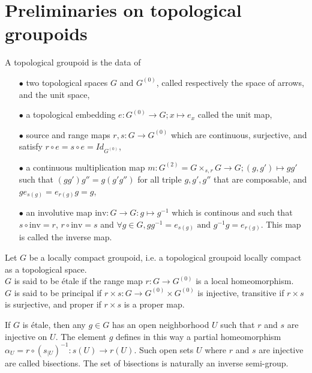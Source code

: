 \section{Preliminaries on topological groupoids}

\begin{definition}
A topological groupoid is the data of 
\begin{itemize}
\item[$\bullet$] two topological spaces $G$ and $G^{(0)}$, called respectively the space of arrows, and the unit space,
\item[$\bullet$] a topological embedding $e: G^{(0)}\rightarrow G; x\mapsto e_x$ called the unit map,
\item[$\bullet$] source and range maps $r,s : G\rightarrow G^{(0)}$ which are continuous, surjective, and satisfy $r\circ e = s\circ e = Id_{G^{(0)}}$,
\item[$\bullet$] a continuous multiplication map $m : G^{(2)}=G\times_{s,r}G\rightarrow G; (g,g')\mapsto gg'$ such that $(gg')g''=g(g'g'')$ for all triple $g,g',g''$ that are composable, and $g e_{s(g)} = e_{r(g)} g =g$,
\item[$\bullet$] an involutive map $\text{inv} : G\rightarrow G: g\mapsto g^{-1}$ which is continous and such that $s\circ \text{inv} = r$, $r\circ \text{inv} = s$ and $\forall g\in G, gg^{-1}=e_{s(g)} \text{ and }g^{-1}g=e_{r(g)}$. This map is called the inverse map.
\end{itemize} 
\end{definition}

\begin{definition}
Let $G$ be a locally compact groupoid, i.e. a topological groupoid locally compact as a topological space.\\
$G$ is said to be étale if the range map $r:G\rightarrow G^{(0)}$ is a local homeomorphism.\\
$G$ is said to be principal if $r\times s : G\rightarrow G^{(0)}\times G^{(0)}$ is injective, transitive if $r\times s $ is surjective, and proper if $r\times s $ is a proper map. 
\end{definition}

If $G$ is étale, then any $g\in G$ has an open neighborhood $U$ such that $r$ and $s$ are injective on $U$. The element $g$ defines in this way a partial homeomorphism $\alpha_U = r\circ (s_{|U})^{-1} : s(U)\rightarrow r(U)$. Such open sets $U$ where $r$ and $s$ are injective are called bisections. The set of bisections is naturally an inverse semi-group. \cite{paterson}\\

